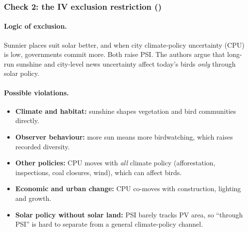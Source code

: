 \documentclass[11pt]{article}
\begin{document}
\subsubsection*{Check 2: the IV exclusion restriction ()}
\paragraph{Logic of exclusion.} Sunnier places suit solar better, and when city climate-policy uncertainty (CPU) is low, governments commit more. Both raise PSI. The authors argue that long-run sunshine and city-level news uncertainty affect today's birds \emph{only} through solar policy.

\paragraph{Possible violations.}
\begin{itemize}
\item \textbf{Climate and habitat:} sunshine shapes vegetation and bird communities directly.
\item \textbf{Observer behaviour:} more sun means more birdwatching, which raises recorded diversity.
\item \textbf{Other policies:} CPU moves with \emph{all} climate policy (afforestation, inspections, coal closures, wind), which can affect birds.
\item \textbf{Economic and urban change:} CPU co-moves with construction, lighting and growth.
\item \textbf{Solar policy without solar land:} PSI barely tracks PV area, so ``through PSI'' is hard to separate from a general climate-policy channel.
\end{itemize}
\end{document}
